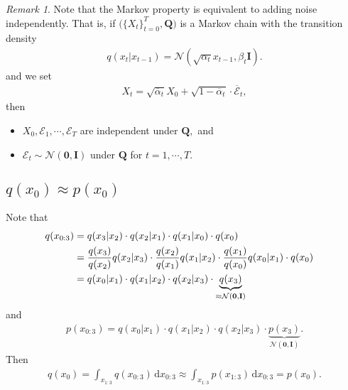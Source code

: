 \documentclass[
]{article}
\providecommand{\tightlist}{%
  \setlength{\itemsep}{0pt}\setlength{\parskip}{0pt}}\usepackage{longtable,booktabs,array}
\theoremstyle{remark}
\newtheorem*{remark}{Remark}
\begin{document}
\begin{remark}
Note that the Markov property is equivalent to adding noise
independently. That is, if
\(\bigl( \lbrace X_t\rbrace_{t=0}^T, \mathbf{Q} \bigr)\) is a Markov
chain with the transition density \[
\begin{aligned}
  q(x_t\vert x_{t-1}) = \mathcal{N}(\sqrt{\alpha_t}x_{t-1},\beta_t \mathbf{I}).
\end{aligned}
\] and we set \[
\begin{aligned}
  X_t = \sqrt{\overline{\alpha}_t}X_{0}+\sqrt{1-\overline{\alpha}_t}\cdot \overline{\mathcal{E}}_t,
\end{aligned}
\] then

\begin{itemize}
\tightlist
\item
  \(X_0,\mathcal{E}_1,\cdots,\mathcal{E}_T\) are independent under
  \(\mathbf{Q},\) and
\item
  \(\mathcal{E}_t\sim \mathcal{N}(\mathbf{0},\mathbf{I})\) under
  \(\mathbf{Q}\) for \(t=1,\cdots, T.\)
\end{itemize}

\end{remark}

\subsection{\texorpdfstring{\(q(x_0) \approx p(x_0)\)}{q(x\_0) \textbackslash approx p(x\_0)}}\label{qx_0-approx-px_0}

Note that \[
\begin{aligned}
  q(x_{0:3}) 
  &= q(x_3\vert x_2) \cdot q(x_2\vert x_1) \cdot q(x_1\vert x_0) \cdot q(x_0) \cr 
  &= \frac{q(x_3)}{q(x_2)}q(x_2\vert x_3) \cdot \frac{q(x_2)}{q(x_1)}q(x_1\vert x_2)\cdot \frac{q(x_1)}{q(x_0)} q(x_0\vert x_1) \cdot q(x_0) \cr 
  &= q(x_0\vert x_1) \cdot q(x_1\vert x_2) \cdot q(x_2\vert x_3) \cdot \underbrace{q(x_3)}_{\approx \mathcal{N}(\mathbf{0},\mathbf{I})}
\end{aligned}
\] and \[
\begin{aligned}
  p(x_{0:3}) = q(x_0\vert x_1) \cdot q(x_1\vert x_2) \cdot q(x_2\vert x_3) \cdot \underbrace{p(x_3)}_{\mathcal{N}(\mathbf{0},\mathbf{I})}.
\end{aligned}
\] Then \[
\begin{aligned}
  q(x_0) = \int_{x_{1:3}} q(x_{0:3}) \, \mathrm{d}x_{0:3} \approx \int_{x_{1:3}} p(x_{1:3}) \, \mathrm{d}x_{0:3} = p(x_0).
\end{aligned}
\]
\end{document}
